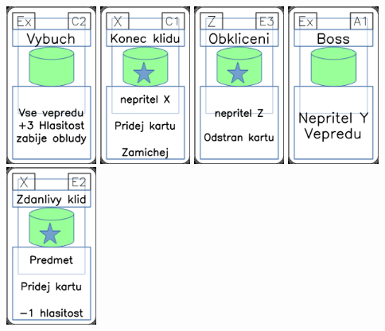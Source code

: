 \documentclass[a4paper]{article}
\begin{document}
	\includegraphics[width=3.0cm]{img-4_11}
	\includegraphics[width=3.0cm]{img-5_10}
	\includegraphics[width=3.0cm]{img-5_52}
	\includegraphics[width=3.0cm]{img-4_0}
	\includegraphics[width=3.0cm]{img-5_21}
\end{document}
